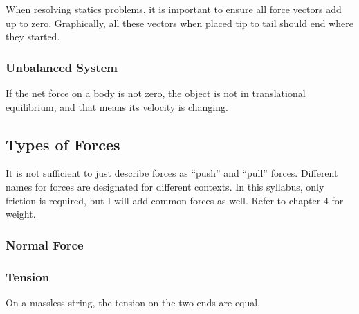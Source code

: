 \documentclass[../main.tex]{subfiles}
\begin{document}
		When resolving statics problems, it is important to ensure all force vectors add up to zero. Graphically, all these vectors when placed tip to tail should end where they started.
			
		\subsubsection{Unbalanced System}
		If the net force on a body is not zero, the object is not in translational equilibrium, and that means its velocity is changing.
		
		\subsection{Types of Forces}
		It is not sufficient to just describe forces as ``push'' and ``pull'' forces. Different names for forces are designated for different contexts. In this syllabus, only friction is required, but I will add common forces as well. Refer to chapter 4 for weight.
		
			\subsubsection{Normal Force}
			\begin{center}
			\end{center}
		
			\subsubsection{Tension}
			On a massless string, the tension on the two ends are equal.
			\begin{center}
			\end{center}
		
\end{document}
